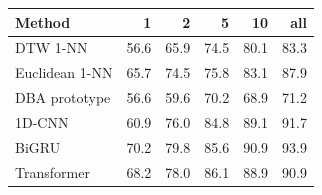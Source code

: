 \begin{tabular}{lrrrrr}
\toprule
Method & 1 & 2 & 5 & 10 & all \\
\midrule
DTW 1-NN & 56.6 & 65.9 & 74.5 & 80.1 & 83.3 \\
Euclidean 1-NN & 65.7 & 74.5 & 75.8 & 83.1 & 87.9 \\
DBA prototype & 56.6 & 59.6 & 70.2 & 68.9 & 71.2 \\
1D-CNN & 60.9 & 76.0 & 84.8 & 89.1 & 91.7 \\
BiGRU & 70.2 & 79.8 & 85.6 & 90.9 & 93.9 \\
Transformer & 68.2 & 78.0 & 86.1 & 88.9 & 90.9 \\
\bottomrule
\end{tabular}
